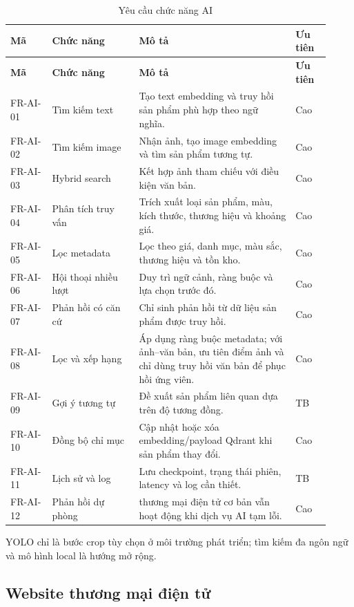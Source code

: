 \begin{longtable}{|p{0.12\linewidth}|p{0.25\linewidth}|p{0.45\linewidth}|p{0.10\linewidth}|}
\caption{Yêu cầu chức năng AI}\label{tab:ai-functional-requirements}\\
\hline
\textbf{Mã} & \textbf{Chức năng} & \textbf{Mô tả} & \textbf{Ưu tiên} \\
\hline
\endfirsthead
\hline
\textbf{Mã} & \textbf{Chức năng} & \textbf{Mô tả} & \textbf{Ưu tiên} \\
\hline
\endhead
FR-AI-01 & Tìm kiếm text & Tạo text embedding và truy hồi sản phẩm phù hợp theo ngữ nghĩa. & Cao \\
\hline
FR-AI-02 & Tìm kiếm image & Nhận ảnh, tạo image embedding và tìm sản phẩm tương tự. & Cao \\
\hline
FR-AI-03 & Hybrid search & Kết hợp ảnh tham chiếu với điều kiện văn bản. & Cao \\
\hline
FR-AI-04 & Phân tích truy vấn & Trích xuất loại sản phẩm, màu, kích thước, thương hiệu và khoảng giá. & Cao \\
\hline
FR-AI-05 & Lọc metadata & Lọc theo giá, danh mục, màu sắc, thương hiệu và tồn kho. & Cao \\
\hline
FR-AI-06 & Hội thoại nhiều lượt & Duy trì ngữ cảnh, ràng buộc và lựa chọn trước đó. & Cao \\
\hline
FR-AI-07 & Phản hồi có căn cứ & Chỉ sinh phản hồi từ dữ liệu sản phẩm được truy hồi. & Cao \\
\hline
FR-AI-08 & Lọc và xếp hạng & Áp dụng ràng buộc metadata; với ảnh--văn bản, ưu tiên điểm ảnh và chỉ dùng truy hồi văn bản để phục hồi ứng viên. & Cao \\
\hline
FR-AI-09 & Gợi ý tương tự & Đề xuất sản phẩm liên quan dựa trên độ tương đồng. & TB \\
\hline
FR-AI-10 & Đồng bộ chỉ mục & Cập nhật hoặc xóa embedding/payload Qdrant khi sản phẩm thay đổi. & Cao \\
\hline
FR-AI-11 & Lịch sử và log & Lưu checkpoint, trạng thái phiên, latency và log cần thiết. & TB \\
\hline
FR-AI-12 & Phản hồi dự phòng & thương mại điện tử cơ bản vẫn hoạt động khi dịch vụ AI tạm lỗi. & Cao \\
\hline
\end{longtable}
YOLO chỉ là bước crop tùy chọn ở môi trường phát triển; tìm kiếm đa ngôn ngữ và mô hình local là hướng mở rộng.

\subsection{Website thương mại điện tử}

